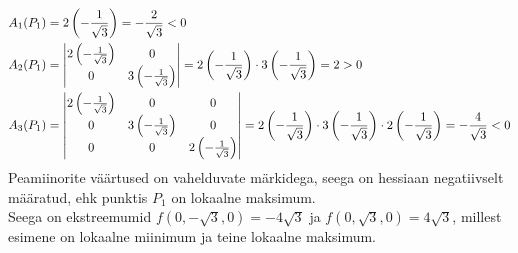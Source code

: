 \documentclass{article}
\begin{document}
\begin{align}
A_1(P_1)&= 2\left(-\frac{1}{\sqrt{3}}\right)=-\frac{2}{\sqrt{3}}<0\notag\\
A_2(P_1)&=\begin{vmatrix}
2\left(-\frac{1}{\sqrt{3}}\right) & 0\\
0 & 3\left(-\frac{1}{\sqrt{3}}\right)\notag
\end{vmatrix}=2\left(-\frac{1}{\sqrt{3}}\right)\cdot3\left(-\frac{1}{\sqrt{3}}\right)=2>0\\
A_3(P_1)&=\begin{vmatrix}
2\left(-\frac{1}{\sqrt{3}}\right) & 0 & 0\\
0 & 3\left(-\frac{1}{\sqrt{3}}\right) & 0\\
0 & 0 & 2\left(-\frac{1}{\sqrt{3}}\right)\notag
\end{vmatrix}=2\left(-\frac{1}{\sqrt{3}}\right)\cdot3\left(-\frac{1}{\sqrt{3}}\right)\cdot2\left(-\frac{1}{\sqrt{3}}\right)=-\frac{4}{\sqrt{3}}<0
\end{align}
Peamiinorite väärtused on vahelduvate märkidega, seega on hessiaan negatiivselt määratud, ehk punktis $P_1$ on lokaalne maksimum.\\
Seega on ekstreemumid $f(0, -\sqrt{3},0)=-4\sqrt{3}$ ja $f(0, \sqrt{3},0)=4\sqrt{3}$, millest esimene on lokaalne miinimum ja teine lokaalne maksimum.
\end{document}
